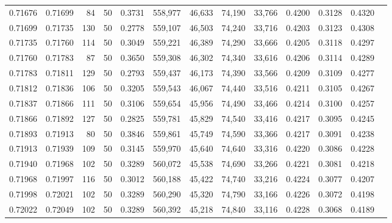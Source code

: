\begin{tabular}{rrrrrrrrrrrrr}
0.71676 & 0.71699 &    84 &  50 &                                     0.3731 & 558,977 &  46,633 &  74,190 &  33,766 & 0.4200 & 0.3128 & 0.4320 \\
0.71699 & 0.71735 &   130 &  50 &                                     0.2778 & 559,107 &  46,503 &  74,240 &  33,716 & 0.4203 & 0.3123 & 0.4308 \\
0.71735 & 0.71760 &   114 &  50 &                                     0.3049 & 559,221 &  46,389 &  74,290 &  33,666 & 0.4205 & 0.3118 & 0.4297 \\
0.71760 & 0.71783 &    87 &  50 &                                     0.3650 & 559,308 &  46,302 &  74,340 &  33,616 & 0.4206 & 0.3114 & 0.4289 \\
0.71783 & 0.71811 &   129 &  50 &                                     0.2793 & 559,437 &  46,173 &  74,390 &  33,566 & 0.4209 & 0.3109 & 0.4277 \\
0.71812 & 0.71836 &   106 &  50 &                                     0.3205 & 559,543 &  46,067 &  74,440 &  33,516 & 0.4211 & 0.3105 & 0.4267 \\
0.71837 & 0.71866 &   111 &  50 &                                     0.3106 & 559,654 &  45,956 &  74,490 &  33,466 & 0.4214 & 0.3100 & 0.4257 \\
0.71866 & 0.71892 &   127 &  50 &                                     0.2825 & 559,781 &  45,829 &  74,540 &  33,416 & 0.4217 & 0.3095 & 0.4245 \\
0.71893 & 0.71913 &    80 &  50 &                                     0.3846 & 559,861 &  45,749 &  74,590 &  33,366 & 0.4217 & 0.3091 & 0.4238 \\
0.71913 & 0.71939 &   109 &  50 &                                     0.3145 & 559,970 &  45,640 &  74,640 &  33,316 & 0.4220 & 0.3086 & 0.4228 \\
0.71940 & 0.71968 &   102 &  50 &                                     0.3289 & 560,072 &  45,538 &  74,690 &  33,266 & 0.4221 & 0.3081 & 0.4218 \\
0.71968 & 0.71997 &   116 &  50 &                                     0.3012 & 560,188 &  45,422 &  74,740 &  33,216 & 0.4224 & 0.3077 & 0.4207 \\
0.71998 & 0.72021 &   102 &  50 &                                     0.3289 & 560,290 &  45,320 &  74,790 &  33,166 & 0.4226 & 0.3072 & 0.4198 \\
0.72022 & 0.72049 &   102 &  50 &                                     0.3289 & 560,392 &  45,218 &  74,840 &  33,116 & 0.4228 & 0.3068 & 0.4189 \\

\end{tabular}
